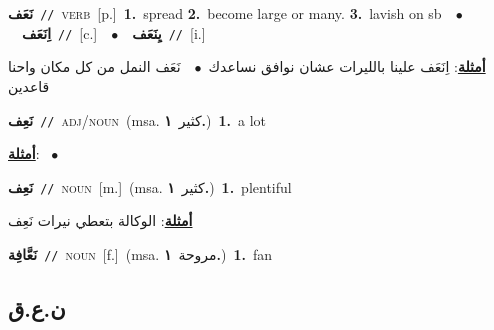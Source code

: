 \documentclass[10pt,a4paper,twoside]{article} %
\begin{document}
\begin{multicols}{2}
{\setlength\topsep{0pt}\textbf{\foreignlanguage{arabic}{نَعَف}}\ {\color{gray}\texttt{//}\color{black}}\ \textsc{verb}\ [p.]\ \textbf{1.}~spread  \textbf{2.}~become large or many.  \textbf{3.}~lavish on sb\ \ $\bullet$\ \ \setlength\topsep{0pt}\textbf{\foreignlanguage{arabic}{اِنَعَف}}\ {\color{gray}\texttt{//}\color{black}}\ [c.]\ \ $\bullet$\ \ \setlength\topsep{0pt}\textbf{\foreignlanguage{arabic}{يِنَعَف}}\ {\color{gray}\texttt{//}\color{black}}\ [i.]\  \begin{flushright}\color{gray}\foreignlanguage{arabic}{\textbf{\underline{\foreignlanguage{arabic}{أمثلة}}}: اِنَعَف علينا بالليرات عشان نوافق نساعدك\ $\bullet$\ \  نَعَف النمل من كل مكان واحنا قاعدين}\end{flushright}\color{black}} \vspace{2mm}

{\setlength\topsep{0pt}\textbf{\foreignlanguage{arabic}{نَعِف}}\ {\color{gray}\texttt{//}\color{black}}\ \textsc{adj/noun}\ \color{gray}(msa. \foreignlanguage{arabic}{كثير}~\foreignlanguage{arabic}{\textbf{١.}})\color{black}\ \textbf{1.}~a lot\  \begin{flushright}\color{gray}\foreignlanguage{arabic}{\textbf{\underline{\foreignlanguage{arabic}{أمثلة}}}: \ $\bullet$\ \  }\end{flushright}\color{black}} \vspace{2mm}

{\setlength\topsep{0pt}\textbf{\foreignlanguage{arabic}{نَعِف}}\ {\color{gray}\texttt{//}\color{black}}\ \textsc{noun}\ [m.]\ \color{gray}(msa. \foreignlanguage{arabic}{كثير}~\foreignlanguage{arabic}{\textbf{١.}})\color{black}\ \textbf{1.}~plentiful\  \begin{flushright}\color{gray}\foreignlanguage{arabic}{\textbf{\underline{\foreignlanguage{arabic}{أمثلة}}}: الوكالة بتعطي نيرات نَعِف}\end{flushright}\color{black}} \vspace{2mm}

{\setlength\topsep{0pt}\textbf{\foreignlanguage{arabic}{نَعَّافِة}}\ {\color{gray}\texttt{//}\color{black}}\ \textsc{noun}\ [f.]\ \color{gray}(msa. \foreignlanguage{arabic}{مروحة}~\foreignlanguage{arabic}{\textbf{١.}})\color{black}\ \textbf{1.}~fan\ } \vspace{2mm}

\vspace{-3mm}
\subsection*{\color{blue}\foreignlanguage{arabic}{ن.ع.ق}\color{blue}{}} 


\end{multicols}
\end{document}
